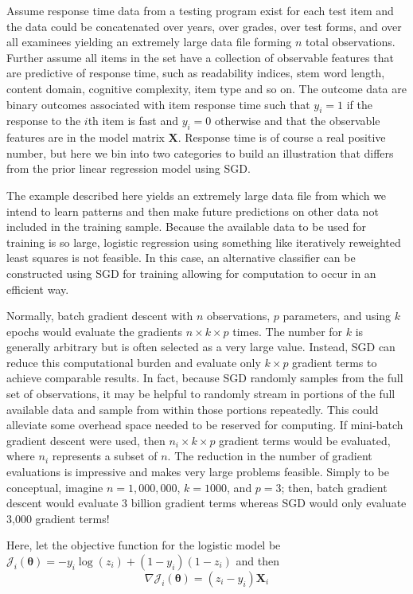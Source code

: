 \documentclass[12pt]{article}
\begin{document}
Assume response time data from a testing program exist for each test item and the data could be concatenated over years, over grades, over test forms, and over all examinees yielding an extremely large data file forming $n$ total observations. Further assume all items in the set have a collection of observable features that are predictive of response time, such as readability indices, stem word length, content domain, cognitive complexity, item type and so on. The outcome data are binary outcomes associated with item response time such that $y_{i} = 1$ if the response to the $i$th item is fast and $y_{i}=0$ otherwise and that the observable features are in the model matrix $\bm{X}$. Response time is of course a real positive number, but here we bin into two categories to build an illustration that differs from the prior linear regression model using SGD.   

The example described here yields an extremely large data file from which we intend to learn patterns and then make future predictions on other data not included in the training sample. Because the available data to be used for training is so large, logistic regression using something like iteratively reweighted least squares is not feasible. In this case, an alternative classifier can be constructed using SGD for training allowing for computation to occur in an efficient way. 

Normally, batch gradient descent with $n$ observations, $p$ parameters, and using $k$ epochs would evaluate the gradients $n \times k \times p$ times. The number for $k$ is generally arbitrary but is often selected as a very large value. Instead, SGD can reduce this computational burden and evaluate only $k \times p$ gradient terms to achieve comparable results. In fact, because SGD randomly samples from the full set of observations, it may be helpful to randomly stream in portions of the full available data and sample from within those portions repeatedly. This could alleviate some overhead space needed to be reserved for computing. If mini-batch gradient descent were used, then $n_i \times k \times p$ gradient terms would be evaluated, where $n_i$ represents a subset of $n$. The reduction in the number of gradient evaluations is impressive and makes very large problems feasible. Simply to be conceptual, imagine $n=1,000,000$, $k=1000$, and $p=3$; then, batch gradient descent would evaluate 3 billion gradient terms whereas SGD would only evaluate 3,000 gradient terms!

Here, let the objective function for the logistic model be $\mathcal{J}_i(\bm{\theta}) = -y_i\log(z_i) + (1 - y_i)(1-z_i)$ and then 
\begin{equation}
\label{eqn:sgdLogis}
\nabla\mathcal{J}_i(\bm{\theta}) = (z_i - y_i)\bm{X}_i
\end{equation}
\end{document}
